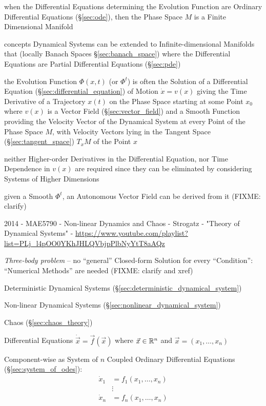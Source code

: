 when the Differential Equations determining the Evolution Function are Ordinary
Differential Equations (\S\ref{sec:ode}), then the Phase Space $M$ is a Finite
Dimensional Manifold

concepts Dynamical Systems can be extended to Infinite-dimensional Manifolds
that (locally Banach Spaces \S\ref{sec:banach_space}) where the Differential
Equations are Partial Differential Equations (\S\ref{sec:pde})

the Evolution Function $\Phi(x,t)$ (or $\Phi^t$) is often the Solution of a
Differential Equation (\S\ref{sec:differential_equation}) of Motion $\dot{x} =
v(x)$ giving the Time Derivative of a Trajectory $x(t)$ on the Phase Space
starting at some Point $x_0$ where $v(x)$ is a Vector Field
(\S\ref{sec:vector_field}) and a Smooth Function providing the Velocity Vector
of the Dynamical System at every Point of the Phase Space $M$, with Velocity
Vectors lying in the Tangent Space (\S\ref{sec:tangent_space}) $T_xM$ of the
Point $x$

neither Higher-order Derivatives in the Differential Equation, nor Time
Dependence in $v(x)$ are required since they can be eliminated by considering
Systems of Higher Dimensions

given a Smooth $\Phi^t$, an Autonomous Vector Field can be derived from it
(FIXME: clarify)

\asterism

2014 - MAE5790 - Non-linear Dynamics and Chaos - Strogatz - "Theory of
Dynamical Systems" -
\url{https://www.youtube.com/playlist?list=PLj_l4pOO0YKhJHLQVbjpPlbNyYtT8aAQz}

\emph{Three-body problem} -- no ``general'' Closed-form Solution for every
``Condition'': ``Numerical Methods'' are needed
(FIXME: clarify and xref)

Deterministic Dynamical Systems (\S\ref{sec:deterministic_dynamical_system})

Non-linear Dynamical Systems (\S\ref{sec:nonlinear_dynamical_system})

Chaos (\S\ref{sec:chaos_theory})

Differential Equations $\dot{\vec{x}} = \vec{f}(\vec{x})$ where
$\vec{x} \in \mathbb{R}^n$ and $\vec{x} = (x_1,\ldots,x_n)$

Component-wise as System of $n$ Coupled Ordinary Differential Equations
(\S\ref{sec:system_of_odes}):
\begin{align*}
  \dot{x}_1 & = f_1(x_1,\ldots,x_n) \\
            & \vdots \\
  \dot{x}_n & = f_n(x_1,\ldots,x_n)
\end{align*}

